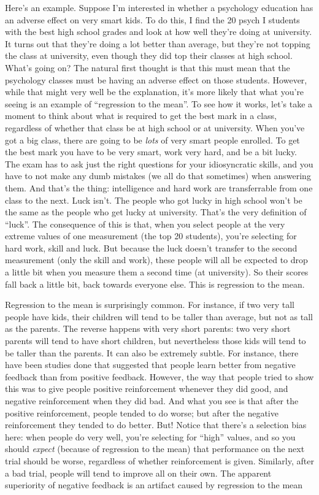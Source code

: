\documentclass[
]{book}
\begin{document}
Here's an example. Suppose I'm interested in whether a psychology education has an adverse effect on very smart kids. To do this, I find the 20 psych I students with the best high school grades and look at how well they're doing at university. It turns out that they're doing a lot better than average, but they're not topping the class at university, even though they did top their classes at high school. What's going on? The natural first thought is that this must mean that the psychology classes must be having an adverse effect on those students. However, while that might very well be the explanation, it's more likely that what you're seeing is an example of ``regression to the mean''. To see how it works, let's take a moment to think about what is required to get the best mark in a class, regardless of whether that class be at high school or at university. When you've got a big class, there are going to be {\emph{lots}} of very smart people enrolled. To get the best mark you have to be very smart, work very hard, and be a bit lucky. The exam has to ask just the right questions for your idiosyncratic skills, and you have to not make any dumb mistakes (we all do that sometimes) when answering them. And that's the thing: intelligence and hard work are transferrable from one class to the next. Luck isn't. The people who got lucky in high school won't be the same as the people who get lucky at university. That's the very definition of ``luck''. The consequence of this is that, when you select people at the very extreme values of one measurement (the top 20 students), you're selecting for hard work, skill and luck. But because the luck doesn't transfer to the second measurement (only the skill and work), these people will all be expected to drop a little bit when you measure them a second time (at university). So their scores fall back a little bit, back towards everyone else. This is regression to the mean.

Regression to the mean is surprisingly common. For instance, if two very tall people have kids, their children will tend to be taller than average, but not as tall as the parents. The reverse happens with very short parents: two very short parents will tend to have short children, but nevertheless those kids will tend to be taller than the parents. It can also be extremely subtle. For instance, there have been studies done that suggested that people learn better from negative feedback than from positive feedback. However, the way that people tried to show this was to give people positive reinforcement whenever they did good, and negative reinforcement when they did bad. And what you see is that after the positive reinforcement, people tended to do worse; but after the negative reinforcement they tended to do better. But! Notice that there's a selection bias here: when people do very well, you're selecting for ``high'' values, and so you should {\emph{expect}} (because of regression to the mean) that performance on the next trial should be worse, regardless of whether reinforcement is given. Similarly, after a bad trial, people will tend to improve all on their own. The apparent superiority of negative feedback is an artifact caused by regression to the mean \citep{Kahneman1973}
\end{document}

